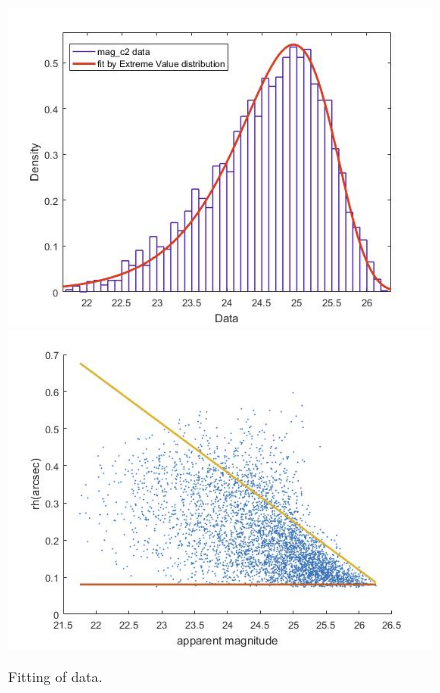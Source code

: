 \documentclass[a4paper,fleqn,usenatbib]{mnras}
\begin{document}
\begin{figure}
  \includegraphics[scale=0.21]{fig_of_mag.jpg}
  \includegraphics[scale=0.21]{fitting_of_rh.jpg}
  \caption{Fitting of data.}
\label{figMagDistribution}
\end{figure}
\end{document}
